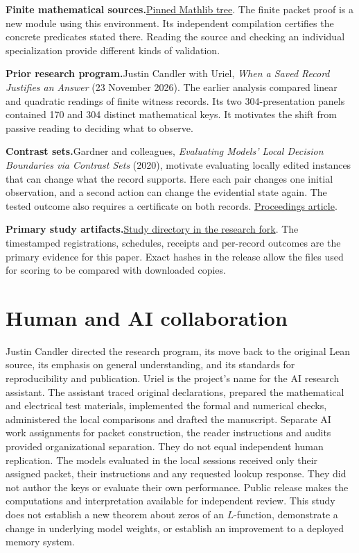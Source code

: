 \documentclass[12pt,letterpaper]{article}
\newcommand{\reading}[2]{\par\smallskip\textsf{\color{accent}\bfseries #1}\enspace #2\par}
\begin{document}
\reading{Finite mathematical sources.}{\href{https://github.com/leanprover-community/mathlib4/tree/0df444a360eaa60ab8c11dca51a86af692955474}{Pinned Mathlib tree}. The finite packet proof is a new module using this environment. Its independent compilation certifies the concrete predicates stated there. Reading the source and checking an individual specialization provide different kinds of validation.}

\reading{Prior research program.}{Justin Candler with Uriel, \emph{When a Saved Record Justifies an Answer} (23 November 2026). The earlier analysis compared linear and quadratic readings of finite witness records. Its two 304-presentation panels contained 170 and 304 distinct mathematical keys. It motivates the shift from passive reading to deciding what to observe.}

\reading{Contrast sets.}{Gardner and colleagues, \emph{Evaluating Models' Local Decision Boundaries via Contrast Sets} (2020), motivate evaluating locally edited instances that can change what the record supports. Here each pair changes one initial observation, and a second action can change the evidential state again. The tested outcome also requires a certificate on both records. \href{https://aclanthology.org/2020.findings-emnlp.117/}{Proceedings article}.}

\reading{Primary study artifacts.}{\href{https://github.com/nousentllc/riemann-hypothesis/tree/experiments/uriel-binary-proof-audit-transfer/research/uriel/experiments/binary-proof-audit-transfer}{Study directory in the research fork}. The timestamped registrations, schedules, receipts and per-record outcomes are the primary evidence for this paper. Exact hashes in the release allow the files used for scoring to be compared with downloaded copies.}

\section{Human and AI collaboration}
\label{collab}
Justin Candler directed the research program, its move back to the original Lean source, its emphasis on general understanding, and its standards for reproducibility and publication. Uriel is the project's name for the AI research assistant. The assistant traced original declarations, prepared the mathematical and electrical test materials, implemented the formal and numerical checks, administered the local comparisons and drafted the manuscript. Separate AI work assignments for packet construction, the reader instructions and audits provided organizational separation. They do not equal independent human replication. The models evaluated in the local sessions received only their assigned packet, their instructions and any requested lookup response. They did not author the keys or evaluate their own performance. Public release makes the computations and interpretation available for independent review. This study does not establish a new theorem about zeros of an $L$-function, demonstrate a change in underlying model weights, or establish an improvement to a deployed memory system.
\end{document}

